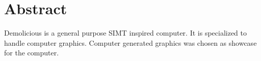 \documentclass[../main/report.tex]{subfiles}
\begin{document}
\chapter*{Abstract}
\label{sec:abstract}

\vspace*{\fill}

Demolicious is a general purpose SIMT inspired computer.
It is specialized to handle computer graphics.
Computer generated graphics was chosen as showcase for the computer.

\vspace*{\fill}
\end{document}
